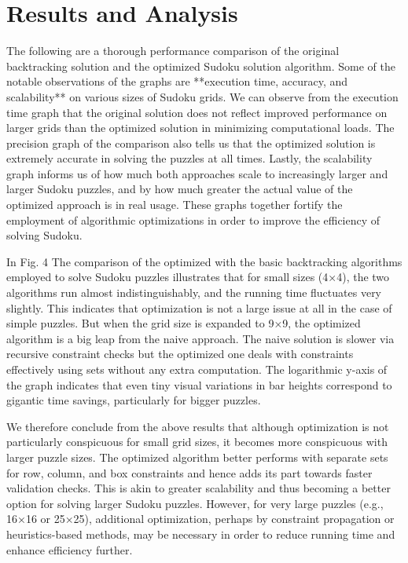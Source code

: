 \documentclass[conference]{IEEEtran}
\begin{document}
\section{Results and Analysis}
The following are a thorough performance comparison of the original backtracking solution and the optimized Sudoku solution algorithm. Some of the notable observations of the graphs are **execution time, accuracy, and scalability** on various sizes of Sudoku grids. We can observe from the execution time graph that the original solution does not reflect improved performance on larger grids than the optimized solution in minimizing computational loads. The precision graph of the comparison also tells us that the optimized solution is extremely accurate in solving the puzzles at all times. Lastly, the scalability graph informs us of how much both approaches scale to increasingly larger and larger Sudoku puzzles, and by how much greater the actual value of the optimized approach is in real usage. These graphs together fortify the employment of algorithmic optimizations in order to improve the efficiency of solving Sudoku.

In Fig. 4 The comparison of the optimized with the basic backtracking algorithms employed to solve Sudoku puzzles illustrates that for small sizes (4×4), the two algorithms run almost indistinguishably, and the running time fluctuates very slightly. This indicates that optimization is not a large issue at all in the case of simple puzzles. But when the grid size is expanded to 9×9, the optimized algorithm is a big leap from the naive approach. The naive solution is slower via recursive constraint checks but the optimized one deals with constraints effectively using sets without any extra computation. The logarithmic y-axis of the graph indicates that even tiny visual variations in bar heights correspond to gigantic time savings, particularly for bigger puzzles.

We therefore conclude from the above results that although optimization is not particularly conspicuous for small grid sizes, it becomes more conspicuous with larger puzzle sizes. The optimized algorithm better performs with separate sets for row, column, and box constraints and hence adds its part towards faster validation checks. This is akin to greater scalability and thus becoming a better option for solving larger Sudoku puzzles. However, for very large puzzles (e.g., 16×16 or 25×25), additional optimization, perhaps by constraint propagation or heuristics-based methods, may be necessary in order to reduce running time and enhance efficiency further.
\end{document}
